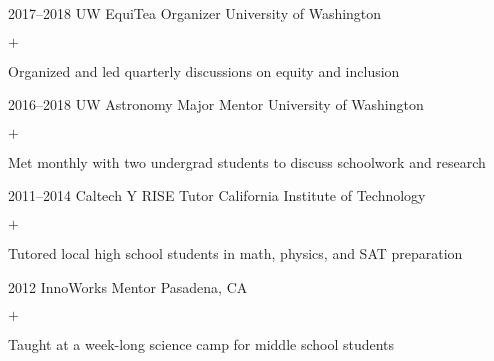 \documentclass[]{luger-cv} %
\begin{document}
\begin{entrylist}

\entry
{2017--2018}
{UW EquiTea Organizer}
{University of Washington}
{%
\vspace{-1em}
\begin{list}{$+$}{\cvlist}
\item Organized and led quarterly discussions on equity and inclusion
\end{list}
}


\entry
{2016--2018}
{UW Astronomy Major Mentor}
{University of Washington}
{%
\vspace{-1em}
\begin{list}{$+$}{\cvlist}
\item Met monthly with two undergrad students to discuss schoolwork and research
\end{list}
}


\ifdefined \onepage \else
\end{entrylist}
%
%
\begin{entrylist}
\fi


\entry
{2011--2014}
{Caltech Y RISE Tutor}
{California Institute of Technology}
{%
\vspace{-1em}
\begin{list}{$+$}{\cvlist}
\item Tutored local high school students in math, physics, and SAT preparation
\fi
\end{list}
}

%

\ifdefined \onepage \else
\entry
{2012}
{InnoWorks Mentor}
{Pasadena, CA}
{%
\vspace{-1em}
\begin{list}{$+$}{\cvlist}
\item Taught at a week-long science camp for middle school students
\end{list}
}
\fi


\end{entrylist}



\end{document}
